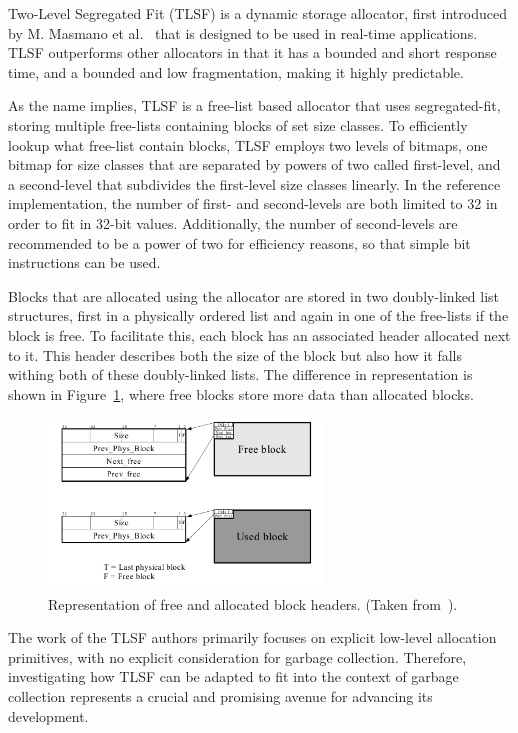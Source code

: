 
Two-Level Segregated Fit (TLSF) is a dynamic storage allocator, first introduced by M. Masmano et al.~\cite{TLSF} that is designed to be used in real-time applications. TLSF outperforms other allocators in that it has a bounded and short response time, and a bounded and low fragmentation, making it highly predictable.

As the name implies, TLSF is a free-list based allocator that uses segregated-fit, storing multiple free-lists containing blocks of set size classes. To efficiently lookup what free-list contain blocks, TLSF employs two levels of bitmaps, one bitmap for size classes that are separated by powers of two called first-level, and a second-level that subdivides the first-level size classes linearly. In the reference implementation, the number of first- and second-levels are both limited to 32 in order to fit in 32-bit values. Additionally, the number of second-levels are recommended to be a power of two for efficiency reasons, so that simple bit instructions can be used.

Blocks that are allocated using the allocator are stored in two doubly-linked list structures, first in a physically ordered list and again in one of the free-lists if the block is free. To facilitate this, each block has an associated header allocated next to it. This header describes both the size of the block but also how it falls withing both of these doubly-linked lists. The difference in representation is shown in Figure~\ref{fig:blockheader_reference}, where free blocks store more data than allocated blocks.

\begin{figure}[H]
    \centering
    \includegraphics[width=0.65\textwidth]{figures/blockheader_reference.png}
    \caption{Representation of free and allocated block headers. (Taken from~\cite{TLSF}).}
    \label{fig:blockheader_reference}
\end{figure}

The work of the TLSF authors primarily focuses on explicit low-level allocation primitives, with no explicit consideration for garbage collection. Therefore, investigating how TLSF can be adapted to fit into the context of garbage collection represents a crucial and promising avenue for advancing its development.

